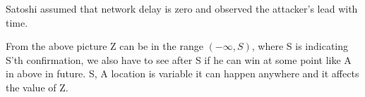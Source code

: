 \documentclass{article}
\begin{document}
Satoshi assumed that network delay is zero and observed the attacker's lead with time.
\begin{center}
\end{center}
From the above picture Z can be in the range $(-\infty, S)$, where S is indicating S'th confirmation, we also have to see after S if he can win at some point like A in above in future. S, A location is variable it can happen anywhere and it affects the value of Z.
\end{document}

